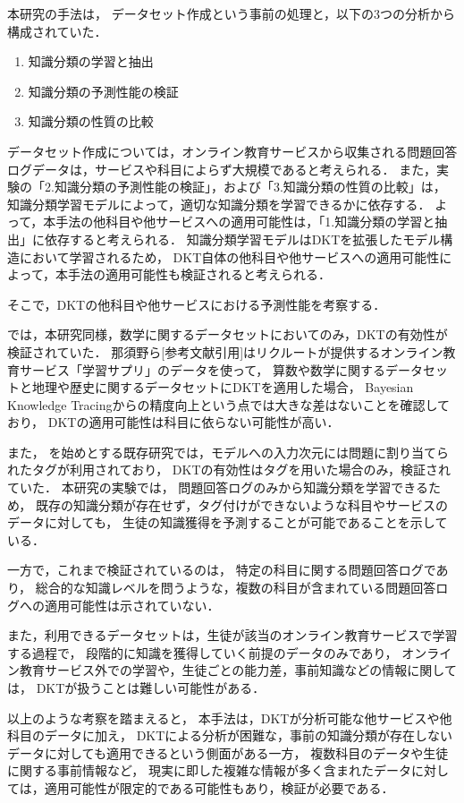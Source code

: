 本研究の手法は，
データセット作成という事前の処理と，以下の3つの分析から構成されていた．
\begin{enumerate}
	\item 知識分類の学習と抽出
	\item 知識分類の予測性能の検証
	\item 知識分類の性質の比較
\end{enumerate}

データセット作成については，オンライン教育サービスから収集される問題回答ログデータは，サービスや科目によらず大規模であると考えられる．
また，実験の「2.知識分類の予測性能の検証」，および「3.知識分類の性質の比較」は，
知識分類学習モデルによって，適切な知識分類を学習できるかに依存する．
よって，本手法の他科目や他サービスへの適用可能性は，「1.知識分類の学習と抽出」に依存すると考えられる．
知識分類学習モデルはDKTを拡張したモデル構造において学習されるため，
DKT自体の他科目や他サービスへの適用可能性によって，本手法の適用可能性も検証されると考えられる．


そこで，DKTの他科目や他サービスにおける予測性能を考察する．

\cite{piech2015deep}では，本研究同様，数学に関するデータセットにおいてのみ，DKTの有効性が検証されていた．
那須野ら[参考文献引用]はリクルートが提供するオンライン教育サービス「学習サプリ」のデータを使って，
算数や数学に関するデータセットと地理や歴史に関するデータセットにDKTを適用した場合，
Bayesian Knowledge Tracingからの精度向上という点では大きな差はないことを確認しており，
DKTの適用可能性は科目に依らない可能性が高い．

また，
\cite{piech2015deep}を始めとする既存研究では，モデルへの入力次元には問題に割り当てられたタグが利用されており，
DKTの有効性はタグを用いた場合のみ，検証されていた．
本研究の実験では，
問題回答ログのみから知識分類を学習できるため，
既存の知識分類が存在せず，タグ付けができないような科目やサービスのデータに対しても，
生徒の知識獲得を予測することが可能であることを示している．


一方で，これまで検証されているのは，
特定の科目に関する問題回答ログであり，
総合的な知識レベルを問うような，複数の科目が含まれている問題回答ログへの適用可能性は示されていない．

また，利用できるデータセットは，生徒が該当のオンライン教育サービスで学習する過程で，
段階的に知識を獲得していく前提のデータのみであり，
オンライン教育サービス外での学習や，生徒ごとの能力差，事前知識などの情報に関しては，
DKTが扱うことは難しい可能性がある．


以上のような考察を踏まえると，
本手法は，DKTが分析可能な他サービスや他科目のデータに加え，
DKTによる分析が困難な，事前の知識分類が存在しないデータに対しても適用できるという側面がある一方，
複数科目のデータや生徒に関する事前情報など，
現実に即した複雑な情報が多く含まれたデータに対しては，適用可能性が限定的である可能性もあり，検証が必要である．


